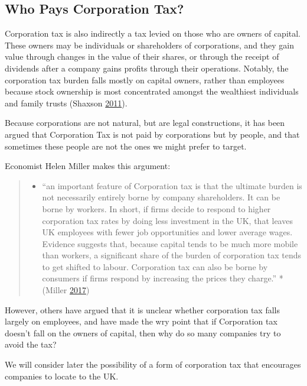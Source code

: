 \documentclass[]{tufte-handout}
\providecommand{\tightlist}{%
  \setlength{\itemsep}{0pt}\setlength{\parskip}{0pt}}
\begin{document}
\hypertarget{who-pays-corporation-tax}{%
\subsection{Who Pays Corporation Tax?}\label{who-pays-corporation-tax}}

Corporation tax is also indirectly a tax levied on those who are owners
of capital. These owners may be individuals or shareholders of
corporations, and they gain value through changes in the value of their
shares, or through the receipt of dividends after a company gains
profits through their operations. Notably, the corporation tax burden
falls mostly on capital owners, rather than employees because stock
ownership is most concentrated amongst the wealthiest individuals and
family trusts (Shaxson \protect\hyperlink{ref-Shaxson2011}{2011}).

Because corporations are not natural, but are legal constructions, it
has been argued that Corporation Tax is not paid by corporations but by
people, and that sometimes these people are not the ones we might prefer
to target.

Economist Helen Miller makes this argument:

\begin{quote}
\begin{itemize}
\tightlist
\item
  ``an important feature of Corporation tax is that the ultimate burden
  is not necessarily entirely borne by company shareholders. It can be
  borne by workers. In short, if firms decide to respond to higher
  corporation tax rates by doing less investment in the UK, that leaves
  UK employees with fewer job opportunities and lower average wages.
  Evidence suggests that, because capital tends to be much more mobile
  than workers, a significant share of the burden of corporation tax
  tends to get shifted to labour. Corporation tax can also be borne by
  consumers if firms respond by increasing the prices they charge.''
  *(Miller \protect\hyperlink{ref-Miller2017}{2017})
\end{itemize}
\end{quote}

However, others have argued that it is unclear whether corporation tax
falls largely on employees, and have made the wry point that if
Corporation tax doesn't fall on the owners of capital, then why do so
many companies try to avoid the tax?

We will consider later the possibility of a form of corporation tax that
encourages companies to locate to the UK.
\end{document}

